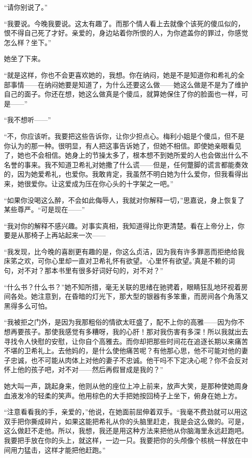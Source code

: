 \par “请你别说了。”
\par “我要说。今晚我要说。这太有趣了。而那个情人看上去就像个该死的傻瓜似的，恨不得自己死了才好。亲爱的，身边站着你所恨的人，为你遮盖你的罪过，你感觉怎么样？坐下。”
\par 她坐了下来。
\par “就是这样，你也不会更喜欢她的，我想。你在纳闷，她是不是知道你和希礼的全部事情——在纳闷她要是知道了，为什么还要这么做——她这么做是不是为了维护自己的面子。你还在想，她这么做真是个傻瓜，就算她保住了你的脸面也一样，可是——”
\par “我不想听——”
\par “不，你应该听。我要把这些告诉你，让你少担点心。梅利小姐是个傻瓜，但不是你认为的那一种。很明显，有人把这事告诉她了，但她不相信。即使她亲眼看见了，她也不会相信。她身上的节操太多了，根本想不到她所爱的人也会做出什么不名誉的事来。我不知道卫希礼对她撒了什么谎——但是，任何蹩脚的谎言都能奏效的，因为她爱希礼，也爱你。我敢肯定，我虽然不明白她为什么爱你，但我看得出来，她很爱你。让这爱成为压在你心头的十字架之一吧。”
\par “如果你没喝这么醉，不会如此侮辱人，我就对你解释一切，”思嘉说，身上恢复了某些尊严。“可是现在——”
\par “我对你的解释不感兴趣。对事实真相，我知道得比你更清楚。看在上帝分上，你要是从那椅子上再站起来一次——
\par “我发现，比今晚的喜剧更有趣的是，你这么贞洁，因为我有许多罪恶而拒绝给我床笫之欢，可你心里却一直对卫希礼怀有欲望。‘心里怀有欲望。’真是不赖的词句，对不对？那本书里有很多好词好句的，对不对？”
\par “什么书？什么书？”她不知所措，毫无关联的思绪在驰骋着，眼睛狂乱地环视着房间各处。她注意到，在昏暗的灯光下，那大型的银器有多笨重，而房间各个角落又黑得多么可怕。
\par “我被拒之门外，是因为我那粗俗的情欲太旺盛了，配不上你的高雅——因为你不想再要孩子。那使我感觉有多糟呀，我的心肝！那对我伤害有多深！所以我就出去寻找令人快慰的安慰，让你自个高雅去。而你却把那些时间花在追逐长期以来痛苦不堪的卫希礼上。去他妈的，是什么使他痛苦呢？有他那心思，他不可能对他的妻子忠诚，也不可能从肉体上对他的妻子不忠诚。他干吗不下定决心呢？你不会反对怀上他的孩子吧，对不对——然后再假冒成是我的？”
\par 她大叫一声，跳起身来，他则从他的座位上冲上前来，放声大笑，是那种使她周身血液发冷的轻柔的笑声。他用棕色的大手把她按回椅子上坐下，俯身在她上方。
\par “注意看看我的手，亲爱的，”他说，在她面前屈伸着双手。“我毫不费劲就可以用这双手把你撕成碎片，如果这能把希礼从你的头脑里赶走，我是会这么做的。可是，这么做赶不走他。所以，我想，我还是用这种方法来把他从你脑海里永远赶跑吧。我要把手放在你的头上，就这样，一边一只。我要把你的头颅像个核桃一样放在中间用力猛击，这样才能把他赶跑。”
